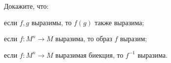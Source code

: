 Докажите, что:
\begin{enumcyr}
    \item если $f, g$ выразимы, то $f(g)$ также выразима;
    \item если $f\colon M^{n} \to M$ выразима, то образ $f$ выразим;
    \item если $f\colon M^{n} \to M$ выразимая биекция, то $f^{-1}$ выразима.
\end{enumcyr}